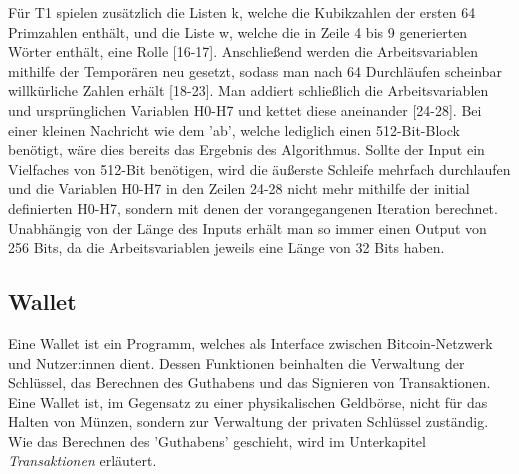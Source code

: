 Für T1 spielen zusätzlich die Listen k, welche die Kubikzahlen der ersten 64 Primzahlen enthält, und die Liste w, welche die in Zeile 4 bis 9 generierten Wörter enthält, eine Rolle [16-17].
Anschließend werden die Arbeitsvariablen mithilfe der Temporären neu gesetzt, sodass man nach 64 Durchläufen scheinbar willkürliche Zahlen erhält [18-23].
Man addiert schließlich die Arbeitsvariablen und ursprünglichen Variablen H0-H7 und kettet diese aneinander [24-28]. Bei einer kleinen Nachricht wie dem 'ab', welche lediglich einen 512-Bit-Block benötigt, wäre dies bereits das Ergebnis des Algorithmus. Sollte der Input ein Vielfaches von 512-Bit benötigen, wird die äußerste Schleife mehrfach durchlaufen und die Variablen H0-H7 in den Zeilen 24-28 nicht mehr mithilfe der initial definierten H0-H7, sondern mit denen der vorangegangenen Iteration berechnet.
Unabhängig von der Länge des Inputs erhält man so immer einen Output von 256 Bits, da die Arbeitsvariablen jeweils eine Länge von 32 Bits haben.

\subsection{Wallet}
Eine Wallet ist ein Programm, welches als Interface zwischen Bitcoin-Netzwerk und Nutzer:innen dient. 
Dessen Funktionen beinhalten die Verwaltung der Schlüssel, das Berechnen des Guthabens und das Signieren von Transaktionen.
Eine Wallet ist, im Gegensatz zu einer physikalischen Geldbörse, nicht für das Halten von Münzen, sondern zur Verwaltung der privaten Schlüssel zuständig. 
Wie das Berechnen des 'Guthabens' geschieht, wird im Unterkapitel \emph{Transaktionen} erläutert.\\

